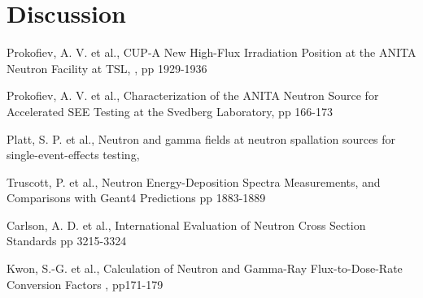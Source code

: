 \documentclass[11pt,a4paper]{IEEEtran}
\begin{document}
\section{Discussion}


\begin{thebibliography}{99} %
									
Prokofiev, A. V. et al., 
\newblock CUP-A New High-Flux Irradiation Position at the ANITA Neutron Facility at TSL,		, pp 1929-1936

Prokofiev, A. V. et al.,
\newblock Characterization of the ANITA Neutron Source for Accelerated SEE Testing at the Svedberg Laboratory,
 pp 166-173 

Platt, S. P. et al.,
\newblock Neutron and gamma fields at neutron spallation sources for single-event-effects testing,

Truscott, P. et al.,
\newblock Neutron Energy-Deposition Spectra Measurements, and Comparisons with Geant4 Predictions
 pp 1883-1889

Carlson, A. D. et al.,
\newblock International Evaluation of Neutron Cross Section Standards
 pp 3215-3324

Kwon, S.-G. et al.,
\newblock Calculation of Neutron and Gamma-Ray Flux-to-Dose-Rate Conversion Factors
, pp171-179


\end{thebibliography}

\cleardoublepage

\todos
\end{document}
